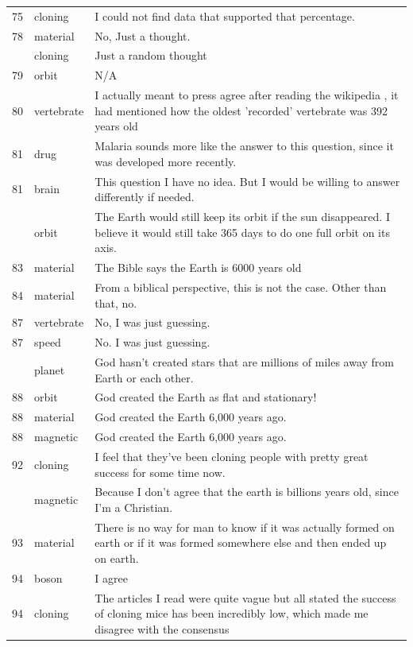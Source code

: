 \documentclass[
  doc,floatsintext]{apa6}
\begin{document}
\begin{longtable}[t]{>{}r>{}l>{\raggedright\arraybackslash}p{30em}}
75 & cloning & I could not find data that supported that percentage.\\
78 & material & No, Just a thought.\\
\addlinespace
78 & cloning & Just a random thought\\
79 & orbit & N/A\\
80 & vertebrate & I actually meant to press agree after reading the wikipedia , it had mentioned how the oldest 'recorded' vertebrate was 392 years old\\
81 & drug & Malaria sounds more like the answer to this question, since it was developed more recently.\\
81 & brain & This question I have no idea. But I would be willing to answer differently if needed.\\
\addlinespace
81 & orbit & The Earth would still keep its orbit if the sun disappeared. I believe it would still take 365 days to do one full orbit on its axis.\\
83 & material & The Bible says the Earth is 6000 years old\\
84 & material & From a biblical perspective, this is not the case. Other than that, no.\\
87 & vertebrate & No, I was just guessing.\\
87 & speed & No. I was just guessing.\\
\addlinespace
88 & planet & God hasn't created stars that are millions of miles away from Earth or each other.\\
88 & orbit & God created the Earth as flat and stationary!\\
88 & material & God created the Earth 6,000 years ago.\\
88 & magnetic & God created the Earth 6,000 years ago.\\
92 & cloning & I feel that they've been cloning people with pretty great success for some time now.\\
\addlinespace
92 & magnetic & Because I don't agree that the earth is billions years old, since I'm a Christian.\\
93 & material & There is no way for man to know if it was actually formed on earth or if it was formed somewhere else and then ended up on earth.\\
94 & boson & I agree\\
94 & cloning & The articles I read were quite vague but all stated the success of cloning mice has been incredibly low, which made me disagree with the consensus\\

\end{longtable}
\end{document}
